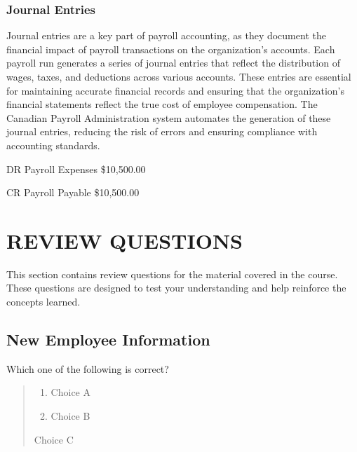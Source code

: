 \documentclass[letterpaper,10pt,english]{sphinxmanual}
\begin{document}
\subsection{Journal Entries}
\label{\detokenize{payroll_accounting:id1}}
\sphinxAtStartPar
Journal entries are a key part of payroll accounting, as they document the financial impact of payroll transactions on the organization’s accounts. Each payroll run generates a series of journal entries that reflect the distribution of wages, taxes, and deductions across various accounts.
These entries are essential for maintaining accurate financial records and ensuring that the organization’s financial statements reflect the true cost of employee compensation. The Canadian Payroll Administration system automates the generation of these journal entries, reducing the risk of errors and ensuring compliance with accounting standards.

\begin{DUlineblock}{0em}
\item[] DR    Payroll Expenses    \$10,500.00
\item[]
\begin{DUlineblock}{\DUlineblockindent}
\item[] CR  Payroll Payable   \$10,500.00
\end{DUlineblock}
\end{DUlineblock}

\sphinxstepscope


\chapter{REVIEW QUESTIONS}
\label{\detokenize{review_questions:review-questions}}\label{\detokenize{review_questions::doc}}
\sphinxAtStartPar
This section contains review questions for the material covered in the course. These questions are designed to test your understanding and help reinforce the concepts learned.


\section{New Employee Information}
\label{\detokenize{review_questions:new-employee-information}}
\sphinxAtStartPar
Which one of the following is correct?
\begin{quote}
\begin{enumerate}
%
\item {} 
\sphinxAtStartPar
Choice A

\item {} 
\sphinxAtStartPar
Choice B

\end{enumerate}

\sphinxAtStartPar
{} Choice C
\end{quote}
\end{document}

